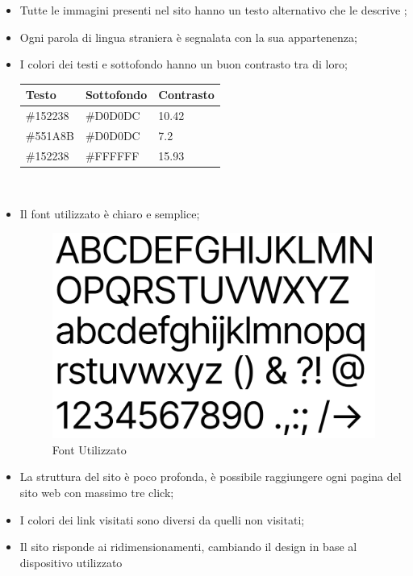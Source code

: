 \begin{itemize}
	\item Tutte le immagini presenti nel sito hanno un testo alternativo che le descrive
	;
	\item Ogni parola di lingua straniera è segnalata con la sua appartenenza;
	\item I colori dei testi e sottofondo hanno un buon contrasto tra di loro;

	\begin{tabular}{| C{4.5cm} | C{4.5cm} | C{4.5cm} |}
		\hline
		\textbf{Testo} & \textbf{Sottofondo} & \textbf{Contrasto}\\
		\hline
		\#152238 & \#D0D0DC & 10.42\\
		\#551A8B & \#D0D0DC & 7.2\\
		\#152238 & \#FFFFFF & 15.93\\
		\hline
	\end{tabular}\\
	\item Il font utilizzato è chiaro e semplice;

	\begin{figure}[H]
	\centering
	\includegraphics[scale=0.4]{res/font.png}
	\caption{Font Utilizzato}
	\end{figure}
	\item La struttura del sito è poco profonda, è possibile raggiungere ogni pagina
	del sito web con massimo tre click;
	\item I colori dei link visitati sono diversi da quelli non visitati;
	\item Il sito risponde ai ridimensionamenti, cambiando il design in base al dispositivo utilizzato
\end{itemize}

	


